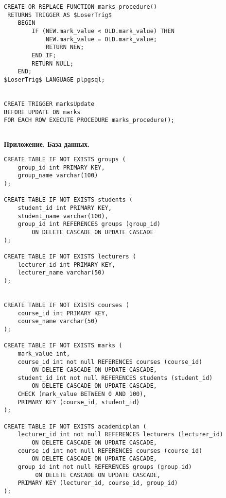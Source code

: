 \documentclass[12pt]{article}
\begin{document}
\begin{enumerate}
\begin{lstlisting}
CREATE OR REPLACE FUNCTION marks_procedure() 
 RETURNS TRIGGER AS $LoserTrig$
    BEGIN
    	IF (NEW.mark_value < OLD.mark_value) THEN 
	    	NEW.mark_value = OLD.mark_value;
    		RETURN NEW;
    	END IF;
    	RETURN NULL;
    END;
$LoserTrig$ LANGUAGE plpgsql;


CREATE TRIGGER marksUpdate
BEFORE UPDATE ON marks
FOR EACH ROW EXECUTE PROCEDURE marks_procedure();     
     
     \end{lstlisting}     

                        

        
\end{enumerate}    



\textbf{Приложение. База данных.}
\begin{lstlisting}     
CREATE TABLE IF NOT EXISTS groups (
	group_id int PRIMARY KEY,
	group_name varchar(100)
);

CREATE TABLE IF NOT EXISTS students (
	student_id int PRIMARY KEY,
	student_name varchar(100),
	group_id int REFERENCES groups (group_id) 
		ON DELETE CASCADE ON UPDATE CASCADE
);

CREATE TABLE IF NOT EXISTS lecturers (
	lecturer_id int PRIMARY KEY,
	lecturer_name varchar(50)
);


CREATE TABLE IF NOT EXISTS courses (
	course_id int PRIMARY KEY,
	course_name varchar(50)
);

CREATE TABLE IF NOT EXISTS marks (
	mark_value int,
	course_id int not null REFERENCES courses (course_id) 
		ON DELETE CASCADE ON UPDATE CASCADE,
	student_id int not null REFERENCES students (student_id) 
		ON DELETE CASCADE ON UPDATE CASCADE,
	CHECK (mark_value BETWEEN 0 AND 100),
	PRIMARY KEY (course_id, student_id)
);

CREATE TABLE IF NOT EXISTS academicplan (
	lecturer_id int not null REFERENCES lecturers (lecturer_id) 
		ON DELETE CASCADE ON UPDATE CASCADE,
	course_id int not null REFERENCES courses (course_id) 
		ON DELETE CASCADE ON UPDATE CASCADE,
	group_id int not null REFERENCES groups (group_id)
		 ON DELETE CASCADE ON UPDATE CASCADE,
	PRIMARY KEY (lecturer_id, course_id, group_id)
);
\end{lstlisting}     
\end{document}
